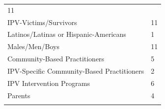 \documentclass[]{tufte-handout}
\begin{document}
\begin{longtable}[]{@{}ll@{}}
\begin{minipage}[t]{0.21\columnwidth}
11\strut
\end{minipage}\tabularnewline
\begin{minipage}[t]{0.59\columnwidth}\raggedright\strut
IPV-Victims/Survivors\strut
\end{minipage} & \begin{minipage}[t]{0.21\columnwidth}\raggedright\strut
11\strut
\end{minipage}\tabularnewline
\begin{minipage}[t]{0.59\columnwidth}\raggedright\strut
Latinos/Latinas or Hispanic-Americans\strut
\end{minipage} & \begin{minipage}[t]{0.21\columnwidth}\raggedright\strut
1\strut
\end{minipage}\tabularnewline
\begin{minipage}[t]{0.59\columnwidth}\raggedright\strut
Males/Men/Boys\strut
\end{minipage} & \begin{minipage}[t]{0.21\columnwidth}\raggedright\strut
11\strut
\end{minipage}\tabularnewline
\begin{minipage}[t]{0.59\columnwidth}\raggedright\strut
Community-Based Practitioners\strut
\end{minipage} & \begin{minipage}[t]{0.21\columnwidth}\raggedright\strut
5\strut
\end{minipage}\tabularnewline
\begin{minipage}[t]{0.59\columnwidth}\raggedright\strut
IPV-Specific Community-Based Practitioners\strut
\end{minipage} & \begin{minipage}[t]{0.21\columnwidth}\raggedright\strut
2\strut
\end{minipage}\tabularnewline
\begin{minipage}[t]{0.59\columnwidth}\raggedright\strut
IPV Intervention Programs\strut
\end{minipage} & \begin{minipage}[t]{0.21\columnwidth}\raggedright\strut
6\strut
\end{minipage}\tabularnewline
\begin{minipage}[t]{0.59\columnwidth}\raggedright\strut
Parents\strut
\end{minipage} & \begin{minipage}[t]{0.21\columnwidth}\raggedright\strut
4\strut
\end{minipage}\tabularnewline
\begin{minipage}[t]{0.59\columnwidth}\raggedright\strut

\end{minipage}
\end{longtable}
\end{document}
